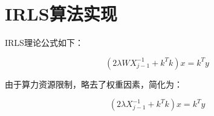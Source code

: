 \documentclass[journal]{IEEEtran}
\begin{document}
%






\section{IRLS算法实现}

IRLS理论公式如下：

\begin{equation}
\left(2 \lambda W X_{j-1}^{-1}+k^{T} k\right) x=k^{T} y
\end{equation}

由于算力资源限制，略去了权重因素，简化为：

\begin{equation}
\left(2 \lambda X_{j-1}^{-1}+k^{T} k\right) x=k^{T} y
\end{equation}
\end{document}
